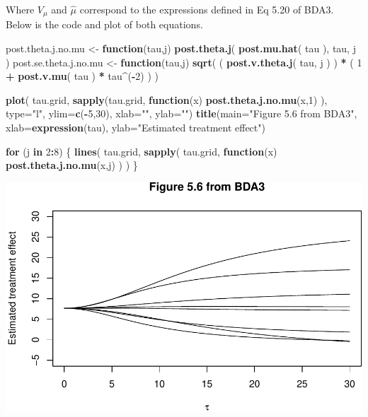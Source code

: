 \documentclass[]{article}
\newenvironment{Shaded}{\begin{snugshade}}{\end{snugshade}}
\newcommand{\KeywordTok}[1]{\textcolor[rgb]{0.13,0.29,0.53}{\textbf{#1}}}
\newcommand{\DataTypeTok}[1]{\textcolor[rgb]{0.13,0.29,0.53}{#1}}
\newcommand{\DecValTok}[1]{\textcolor[rgb]{0.00,0.00,0.81}{#1}}
\newcommand{\StringTok}[1]{\textcolor[rgb]{0.31,0.60,0.02}{#1}}
\newcommand{\ControlFlowTok}[1]{\textcolor[rgb]{0.13,0.29,0.53}{\textbf{#1}}}
\newcommand{\OperatorTok}[1]{\textcolor[rgb]{0.81,0.36,0.00}{\textbf{#1}}}
\newcommand{\NormalTok}[1]{#1}
\begin{document}
Where \(V_{\mu}\) and \(\hat{\mu}\) correspond to the expressions
defined in Eq 5.20 of BDA3. Below is the code and plot of both
equations.

\begin{Shaded}
\begin{Highlighting}[]
\NormalTok{post.theta.j.no.mu     <-}\StringTok{ }\ControlFlowTok{function}\NormalTok{(tau,j) }\KeywordTok{post.theta.j}\NormalTok{( }\KeywordTok{post.mu.hat}\NormalTok{( tau ), tau, j )  }
\NormalTok{post.se.theta.j.no.mu  <-}\StringTok{ }\ControlFlowTok{function}\NormalTok{(tau,j) }\KeywordTok{sqrt}\NormalTok{( }
\NormalTok{  ( }\KeywordTok{post.v.theta.j}\NormalTok{( tau, j ) ) }\OperatorTok{*}\StringTok{ }\NormalTok{( }\DecValTok{1} \OperatorTok{+}\StringTok{ }\KeywordTok{post.v.mu}\NormalTok{( tau ) }\OperatorTok{*}\StringTok{ }\NormalTok{tau}\OperatorTok{^}\NormalTok{(}\OperatorTok{-}\DecValTok{2}\NormalTok{) ) )}

\KeywordTok{plot}\NormalTok{( tau.grid, }\KeywordTok{sapply}\NormalTok{(tau.grid, }\ControlFlowTok{function}\NormalTok{(x) }\KeywordTok{post.theta.j.no.mu}\NormalTok{(x,}\DecValTok{1}\NormalTok{) ), }
      \DataTypeTok{type=}\StringTok{"l"}\NormalTok{, }\DataTypeTok{ylim=}\KeywordTok{c}\NormalTok{(}\OperatorTok{-}\DecValTok{5}\NormalTok{,}\DecValTok{30}\NormalTok{), }
      \DataTypeTok{xlab=}\StringTok{""}\NormalTok{, }\DataTypeTok{ylab=}\StringTok{""}\NormalTok{)}
\KeywordTok{title}\NormalTok{(}\DataTypeTok{main=}\StringTok{"Figure 5.6 from BDA3"}\NormalTok{, }
      \DataTypeTok{xlab=}\KeywordTok{expression}\NormalTok{(tau), }
      \DataTypeTok{ylab=}\StringTok{"Estimated treatment effect"}\NormalTok{)}

\ControlFlowTok{for}\NormalTok{ (j }\ControlFlowTok{in} \DecValTok{2}\OperatorTok{:}\DecValTok{8}\NormalTok{) \{ }
  \KeywordTok{lines}\NormalTok{( tau.grid, }
         \KeywordTok{sapply}\NormalTok{( tau.grid, }\ControlFlowTok{function}\NormalTok{(x) }\KeywordTok{post.theta.j.no.mu}\NormalTok{(x,j) ) )}
\NormalTok{\}}
\end{Highlighting}
\end{Shaded}

\includegraphics{Untitled_files/figure-latex/unnamed-chunk-10-1.pdf}
\end{document}
